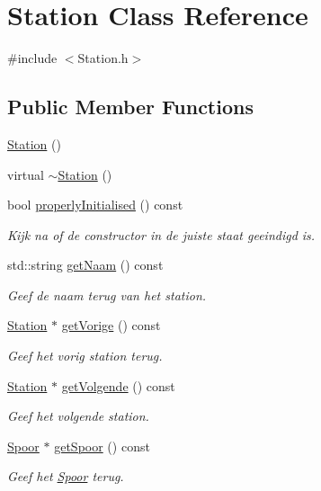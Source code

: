 \hypertarget{class_station}{}\section{Station Class Reference}
\label{class_station}


{\ttfamily \#include $<$Station.\+h$>$}

\subsection*{Public Member Functions}
\begin{DoxyCompactItemize}
\item 
\hyperlink{class_station_a73d335726aad1d844d81cda6d9fd74e6}{Station} ()
\item 
virtual \hyperlink{class_station_a00434e79e8ee7f4ebd6d3b631dde5ac0}{$\sim$\+Station} ()
\item 
bool \hyperlink{class_station_a9ce626dd0599e3ea8107404a59c21e16}{properly\+Initialised} () const
\begin{DoxyCompactList}\small\item\em Kijk na of de constructor in de juiste staat geeindigd is. \end{DoxyCompactList}\item 
std\+::string \hyperlink{class_station_aea6c31c39a5e1eb4c30337e7ce489e69}{get\+Naam} () const
\begin{DoxyCompactList}\small\item\em Geef de naam terug van het station. \end{DoxyCompactList}\item 
\hyperlink{class_station}{Station} $\ast$ \hyperlink{class_station_a69c0539e899ff540c38eb434a69bfa9e}{get\+Vorige} () const
\begin{DoxyCompactList}\small\item\em Geef het vorig station terug. \end{DoxyCompactList}\item 
\hyperlink{class_station}{Station} $\ast$ \hyperlink{class_station_a330c297adddcbfd5d8871075291e9512}{get\+Volgende} () const
\begin{DoxyCompactList}\small\item\em Geef het volgende station. \end{DoxyCompactList}\item 
\hyperlink{class_spoor}{Spoor} $\ast$ \hyperlink{class_station_a5230690094cdfd1e9f443d76f35c8a19}{get\+Spoor} () const
\begin{DoxyCompactList}\small\item\em Geef het \hyperlink{class_spoor}{Spoor} terug. \end{DoxyCompactList}\end{DoxyCompactItemize}



